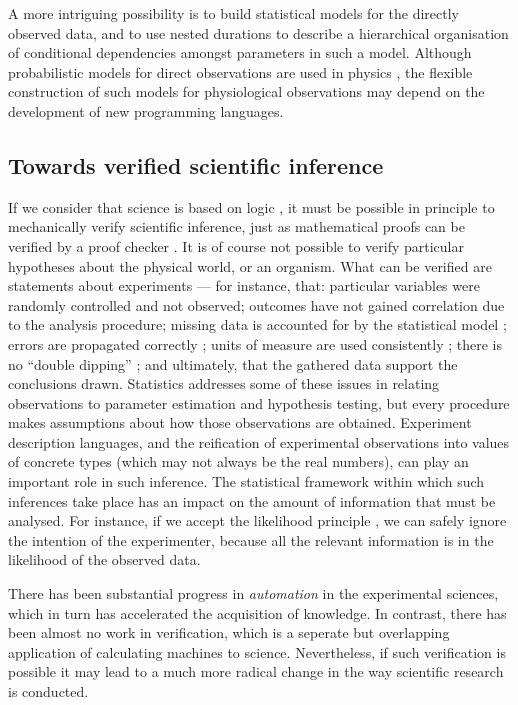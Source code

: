 A more intriguing possibility is to build statistical models for the
directly observed data, and to use nested durations to describe a
hierarchical organisation of conditional dependencies amongst
parameters in such a model. Although probabilistic models for direct
observations are used in physics \citep{Daniell1991}, the flexible
construction of such models for physiological observations may depend
on the development of new programming languages.

\subsection*{Towards verified scientific inference}

If we consider that science is based on logic \citep{Jaynes2003}, it
must be possible in principle to mechanically verify scientific
inference, just as mathematical proofs can be verified by a proof
checker \citep{Harrison2009}. It is of course not possible to verify particular
hypotheses about the physical world, or an organism. What can be
verified are statements about experiments --- for instance, that:
particular variables were randomly controlled and not observed;
outcomes have not gained correlation due to the analysis procedure;
missing data is accounted for by the statistical model
\citep{Gelman2003}; errors are propagated correctly
\citep{Taylor1997}; units of measure are used consistently
\citep{Kennedy1997}; there is no ``double dipping''
\citep{Kriegeskorte2009}; and ultimately, that the gathered data
support the conclusions drawn. Statistics addresses some of these
issues in relating observations to parameter estimation and hypothesis
testing, but every procedure makes assumptions about how those
observations are obtained. Experiment description languages, and the
reification of experimental observations into values of concrete types
(which may not always be the real numbers), can play an
important role in such inference. The statistical framework within
which such inferences take place has an impact on the amount of
information that must be analysed. For instance, if we accept the
likelihood principle \citep{Jaynes2003}, we can safely ignore the
intention of the experimenter, because all the relevant information is
in the likelihood of the observed data. 

There has been substantial progress in \emph{automation} in the
experimental sciences, which in turn has accelerated the acquisition
of knowledge. In contrast, there has been almost no work in
verification, which is a seperate but overlapping application of
calculating machines to science. Nevertheless, if such verification is
possible it may lead to a much more radical change in the way
scientific research is conducted.

